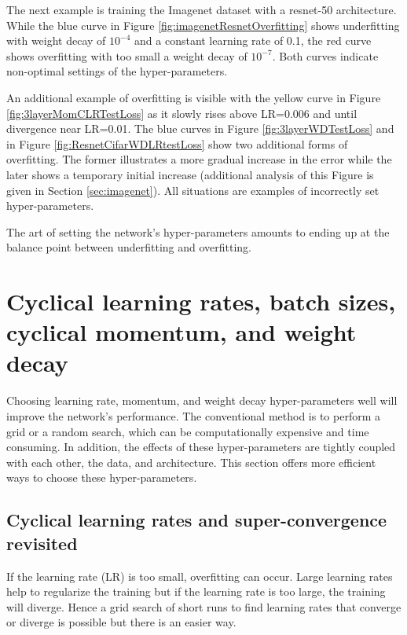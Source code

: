 \documentclass{article} %
\begin{document}
The next example is training the Imagenet dataset with a resnet-50 architecture.  While the blue curve in Figure \ref{fig:imagenetResnetOverfitting}  shows underfitting with weight decay of $10^{-4}$ and a constant learning rate of 0.1, the red curve shows overfitting with too small a weight decay of $10^{-7}$.  Both curves indicate non-optimal settings of the hyper-parameters.  

An additional example of overfitting is visible with the yellow curve in Figure \ref{fig:3layerMomCLRTestLoss} as it slowly rises above LR=0.006 and until divergence near LR=0.01.  The blue curves in Figure \ref{fig:3layerWDTestLoss} and in Figure \ref{fig:ResnetCifarWDLRtestLoss} show two additional forms of overfitting.  The former illustrates a more gradual increase in the error while the later shows a temporary initial increase (additional analysis of this Figure is given in Section \ref{sec:imagenet}). All situations are examples of incorrectly set hyper-parameters.

The art of setting the network's hyper-parameters amounts to ending up at the balance point between underfitting and overfitting.




\section{Cyclical learning rates, batch sizes, cyclical momentum, and weight decay}
\label{sec:cyclicalMomentum}

Choosing learning rate, momentum, and weight decay hyper-parameters well will improve the network's performance.  The conventional method is to perform a grid or a random search, which can be computationally expensive and time consuming. In addition, the effects of these hyper-parameters are tightly coupled with each other, the data, and architecture. This section offers more efficient ways to choose these hyper-parameters.



\subsection{Cyclical learning rates and super-convergence revisited}
\label{sec:CLR}

If the learning rate (LR) is too small, overfitting can occur.  Large learning rates help to regularize the training but if the learning rate is too large, the training will diverge.  Hence a grid search of short runs to find learning rates that converge or diverge is possible but there is an easier way.
\end{document}
